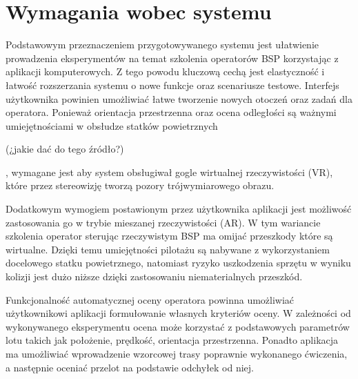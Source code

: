 \newpage
\section{Wymagania wobec systemu}

Podstawowym przeznaczeniem przygotowywanego systemu jest ułatwienie prowadzenia eksperymentów na temat szkolenia operatorów BSP korzystając z aplikacji komputerowych. Z tego powodu kluczową cechą jest elastyczność i łatwość rozszerzania systemu o nowe funkcje oraz scenariusze testowe. Interfejs użytkownika powinien umożliwiać łatwe tworzenie nowych otoczeń oraz zadań dla operatora. Ponieważ orientacja przestrzenna oraz ocena odległości są ważnymi umiejętnościami w obsłudze statków powietrznych \begin{todo}(¿jakie dać do tego źródło?)\end{todo}, wymagane jest aby system obsługiwał gogle wirtualnej rzeczywistości (VR), które przez stereowizję tworzą pozory trójwymiarowego obrazu.

Dodatkowym wymogiem postawionym przez użytkownika aplikacji jest możliwość zastosowania go w trybie mieszanej rzeczywistości (AR). W tym wariancie szkolenia operator sterując rzeczywistym BSP ma omijać przeszkody które są wirtualne. Dzięki temu umiejętności pilotażu są nabywane z wykorzystaniem docelowego statku powietrznego, natomiast ryzyko uszkodzenia sprzętu w wyniku kolizji jest dużo niższe dzięki zastosowaniu niematerialnych przeszkód.

Funkcjonalność automatycznej oceny operatora powinna umożliwiać użytkownikowi aplikacji formułowanie własnych kryteriów oceny. W zależności od wykonywanego eksperymentu ocena może korzystać z podstawowych parametrów lotu takich jak położenie, prędkość, orientacja przestrzenna. Ponadto aplikacja ma umożliwiać wprowadzenie wzorcowej trasy poprawnie wykonanego ćwiczenia, a następnie oceniać przelot na podstawie odchyłek od niej.
